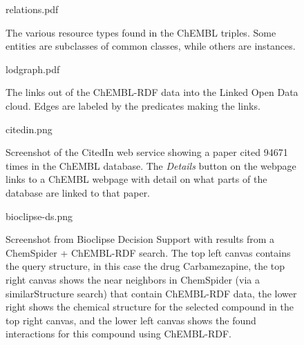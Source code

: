 \documentclass[10pt]{bmc_article}
\newenvironment{bmcformat}{\begin{raggedright}\baselineskip20pt\sloppy\setboolean{publ}{false}}{\end{raggedright}\baselineskip20pt\sloppy}
\begin{document}
\begin{bmcformat}
{
  
}


\newpage

\begin{figure}[t]
\begin{center}
relations.pdf
\caption{The various resource types found in the ChEMBL triples. Some entities are subclasses
of common classes, while others are instances.}\label{f1}
\end{center}
\end{figure}

\begin{figure}[t]
{\center
lodgraph.pdf
\caption{The links out of the ChEMBL-RDF data into the Linked Open Data cloud.
Edges are labeled by the predicates making the links.}\label{2}
}
\end{figure}

\begin{figure*}[!ht]
		\begin{center}
		citedin.png
		\caption[wee]{Screenshot of the CitedIn web service showing a paper cited 94671 times in the ChEMBL database.
		   The \textit{Details} button on the webpage links to a ChEMBL webpage with detail on what parts of the database are
		   linked to that paper.}
	\label{fig:citedin}
		\end{center}
\end{figure*}

\begin{figure*}[!ht]
		\begin{center}
		bioclipse-ds.png
		\caption[wee]{Screenshot from Bioclipse Decision Support with results from a ChemSpider + ChEMBL-RDF search. The top left canvas contains the query structure, in this case the drug Carbamezapine, the top right canvas shows the near neighbors in ChemSpider (via a similarStructure search) that contain ChEMBL-RDF data, the lower right shows the chemical structure for the selected compound in the top right canvas, and the lower left canvas shows the found interactions for this compound using ChEMBL-RDF.}
	\label{fig:bioclipse-ds}
		\end{center}
\end{figure*}


\end{bmcformat}
\end{document}
